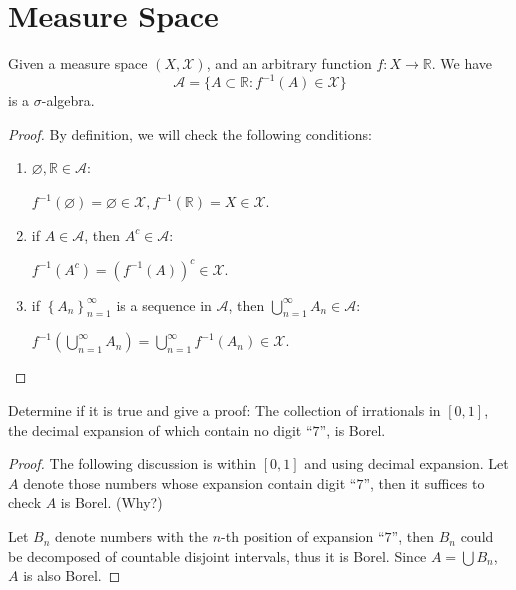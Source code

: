 \section*{Measure Space}

\begin{problem}
Given a measure space $ (X,\mathcal{X}) $, and an arbitrary function $ f\colon X\to \mathbb{R} $. We have
$$
	\mathcal{A}=\{A\subset \mathbb{R}:f^{-1}(A)\in \mathcal{X} \}
$$
is a $ \sigma$-algebra.
\end{problem}

\begin{proof}
	By definition, we will check the following conditions:

	\begin{enumerate}
		\item $ \varnothing,\mathbb{R}\in \mathcal{A} $:

		      $
			      f^{-1}( \varnothing ) =\varnothing \in \mathcal{X},f^{-1}( \mathbb{R} ) =X\in \mathcal{X}.
		      $
		\item if $ A \in \mathcal{A} $, then $ A^{c}\in \mathcal{A} $:

		      $
			      f^{-1}( A^c ) =\left( f^{-1}( A ) \right) ^c\in \mathcal{X}.
		      $
		\item if $
			      \left\{ A_n \right\} _{n=1}^{\infty}
		      $ is a sequence in $ \mathcal{A} $, then $
			      \bigcup_{n=1}^{\infty}{A_n}\in \mathcal{A}
		      $:

		      $
			      f^{-1}( \bigcup_{n=1}^{\infty}{A_n} ) =\bigcup_{n=1}^{\infty}{f^{-1}( A_n )}\in \mathcal{X}.
		      $
	\end{enumerate}
\end{proof}

\begin{problem}
Determine if it is true and give a proof: The collection of irrationals in $ [0,1] $, the decimal expansion of which contain no digit ``$7$'', is Borel.
\end{problem}

\begin{proof}
	The following discussion is within $ [0,1] $ and using decimal expansion.
	Let $ A $ denote those numbers whose expansion contain digit ``$7$'',
	then it suffices to check $ A $ is Borel. (Why?)

	Let $ B_{n} $ denote numbers with the $ n $-th position of expansion ``$7$'',
	then $ B_{n} $ could be decomposed of countable disjoint intervals, thus it is Borel.
	Since $ A=\bigcup B_{n} $, $ A $ is also Borel.
\end{proof}

